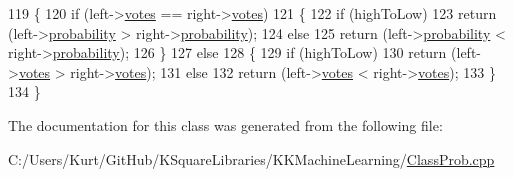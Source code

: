 \begin{DoxyCode}
119   \{ 
120     \textcolor{keywordflow}{if}  (left->\hyperlink{class_k_k_m_l_l_1_1_class_prob_a0e0ab2ae02ec4390c60f87c1ab450da8}{votes} == right->\hyperlink{class_k_k_m_l_l_1_1_class_prob_a0e0ab2ae02ec4390c60f87c1ab450da8}{votes})
121     \{
122       \textcolor{keywordflow}{if}  (highToLow)
123         \textcolor{keywordflow}{return} (left->\hyperlink{class_k_k_m_l_l_1_1_class_prob_acea1b6e0e6011c4d7d1008a73c6bbc37}{probability} > right->\hyperlink{class_k_k_m_l_l_1_1_class_prob_acea1b6e0e6011c4d7d1008a73c6bbc37}{probability});
124       \textcolor{keywordflow}{else}
125         \textcolor{keywordflow}{return} (left->\hyperlink{class_k_k_m_l_l_1_1_class_prob_acea1b6e0e6011c4d7d1008a73c6bbc37}{probability} < right->\hyperlink{class_k_k_m_l_l_1_1_class_prob_acea1b6e0e6011c4d7d1008a73c6bbc37}{probability});
126     \}
127     \textcolor{keywordflow}{else}
128     \{
129       \textcolor{keywordflow}{if}  (highToLow)
130         \textcolor{keywordflow}{return} (left->\hyperlink{class_k_k_m_l_l_1_1_class_prob_a0e0ab2ae02ec4390c60f87c1ab450da8}{votes} > right->\hyperlink{class_k_k_m_l_l_1_1_class_prob_a0e0ab2ae02ec4390c60f87c1ab450da8}{votes});
131       \textcolor{keywordflow}{else}
132         \textcolor{keywordflow}{return} (left->\hyperlink{class_k_k_m_l_l_1_1_class_prob_a0e0ab2ae02ec4390c60f87c1ab450da8}{votes} < right->\hyperlink{class_k_k_m_l_l_1_1_class_prob_a0e0ab2ae02ec4390c60f87c1ab450da8}{votes});
133     \}
134   \}
\end{DoxyCode}


The documentation for this class was generated from the following file\+:\begin{DoxyCompactItemize}
\item 
C\+:/\+Users/\+Kurt/\+Git\+Hub/\+K\+Square\+Libraries/\+K\+K\+Machine\+Learning/\hyperlink{_class_prob_8cpp}{Class\+Prob.\+cpp}\end{DoxyCompactItemize}

